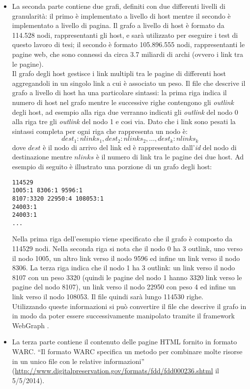 \begin{itemize}
 
 \item La seconda parte contiene due grafi, definiti con due differenti livelli di granularità: il primo è implementato a livello di host mentre il secondo è implementato a livello di pagina. Il grafo a livello di host  è formato da 114.528 nodi, rappresentanti gli host, e sarà utilizzato per eseguire i test di questo lavoro di tesi; il secondo è formato  105.896.555 nodi, rappresentanti le pagine web, che sono  connessi da circa 3.7 miliardi di archi (ovvero i link tra le pagine).\\
 Il grafo degli host gestisce i link multipli tra le pagine di differenti host aggregandoli in un singolo link a cui è associato un peso. Il file che descrive il grafo a livello di host ha una particolare sintassi: la prima riga indica il numero di host nel grafo mentre le successive righe contengono gli \textit{outlink} degli host, ad esempio alla riga due verranno indicati gli \textit{outlink} del nodo 0 alla riga tre gli \textit{outlink} del nodo 1 e cosi via. Dato che i link sono pesati la sintassi completa per ogni riga che rappresenta un nodo è:
 $$
 dest_1:nlinks_1,dest_2:nlinks_2,...,dest_k:nlinks_k
 $$
 dove \(dest\) è il nodo di arrivo del link ed è rappresentato dall'\textit{id} del nodo di destinazione mentre \(nlinks\) è il numero di link tra le pagine dei due host.
 Ad esempio di seguito è illustrato una porzione di un grafo degli host:
\begin{lstlisting}[frame=trbl,postbreak=\space, breakindent=5pt, breaklines]
114529
1005:1 8306:1 9596:1 
8107:3320 22950:4 108053:1
24003:1
24003:1
...
\end{lstlisting}
Nella prima riga dell'esempio viene specificato che il grafo è composto da 114529 nodi. Nella seconda riga si nota che il nodo 0 ha 3 outlink, uno verso il nodo 1005, un altro link verso il nodo 9596 ed infine un link verso il nodo 8306. La terza riga indica che il nodo 1 ha 3 outlink: un link verso il nodo 8107 con un peso 3320 (quindi le pagine del nodo 1 hanno 3320 link verso le pagine del nodo 8107), un link verso il nodo 22950 con peso 4 ed infine un link verso il nodo 108053. Il file quindi sarà lungo 114530 righe.\\
Utilizzando queste informazioni si può convertire il file che descrive il grafo in  in modo da poter essere successivamente manipolato tramite il framework WebGraph \cite{Boldi03thewebgraph}.
\item La terza parte contiene il contenuto delle pagine HTML fornito in formato WARC. ``Il formato WARC specifica un metodo per combinare molte risorse in un unico file con le relative informazioni'' (\url{http://www.digitalpreservation.gov/formats/fdd/fdd000236.shtml} il 5/5/2014).
\end{itemize}

